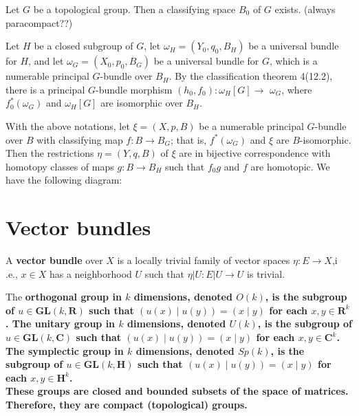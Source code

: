 \begin{theo}[Milnor]
    Let $G$ be a topological group. Then a classifying space $B_0$ of $G$ exists. (always paracompact??)
\end{theo}


Let $H$ be a closed subgroup of $G$, let $\omega_H=\left(Y_0, q_0, B_H\right)$ be a universal bundle for $H$, and let $\omega_G=\left(X_0, p_0, B_G\right)$ be a universal bundle for $G$, which is a numerable principal $G$-bundle over $B_H$. By the classification theorem 4(12.2), there is a principal $G$-bundle morphism $\left(h_0, f_0\right): \omega_H[G] \rightarrow$ $\omega_G$, where $f_0^*\left(\omega_G\right)$ and $\omega_H[G]$ are isomorphic over $B_H$.

\begin{theo}
    With the above notations, let $\xi=(X, p, B)$ be a numerable principal $G$-bundle over $B$ with classifying map $f: B \rightarrow B_G$; that is, $f^*\left(\omega_G\right)$ and $\xi$ are $B$-isomorphic. Then the restrictions $\eta=(Y, q, B)$ of $\xi$ are in bijective correspondence with homotopy classes of maps $g: B \rightarrow B_H$ such that $f_0 g$ and $f$ are homotopic. We have the following diagram:
    
\end{theo}


\section{Vector bundles}
A {\bfseries vector bundle} over $X$ is a locally trivial family of vector spaces $\eta: E \rightarrow X$,i .e., $x \in X$ has a neighborhood $U$ such that $\eta|U: E| U \rightarrow U$ is trivial.

The \bf{orthogonal group} in $k$ dimensions, denoted $O(k)$, is the subgroup of $u \in \mathbf{G L}(k, \mathbf{R})$ such that $(u(x) \mid u(y))=(x \mid y)$ for each $x, y \in \mathbf{R}^k$. The \bf{unitary group} in $k$ dimensions, denoted $U(k)$, is the subgroup of $u \in \mathbf{G L}(k, \mathbf{C})$ such that $(u(x) \mid u(y))=(x \mid y)$ for each $x, y \in \mathbf{C}^k$. The \bf{symplectic group} in $k$ dimensions, denoted $S p(k)$, is the subgroup of $u \in \mathbf{G L}(k, \mathbf{H})$ such that $(u(x) \mid u(y))=(x \mid y)$ for each $x, y \in \mathbf{H}^k$.\\
These groups are closed and bounded subsets of the space of matrices. Therefore, they are compact (topological) groups. 

